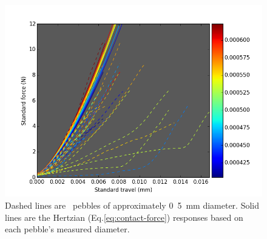 \begin{figure}[!t]
\centering
    \includegraphics[width=\doubleimagewidth]{chapters/figures/fzk-data-w-ideal-hertz.png}
    \caption{Dashed lines are \lis~pebbles of approximately \si{0.5 mm} diameter. Solid lines are the Hertzian (Eq.\ref{eq:contact-force}) responses based on each pebble's measured diameter.}
    \label{fig:fzk-exp-colormap}
\end{figure}

